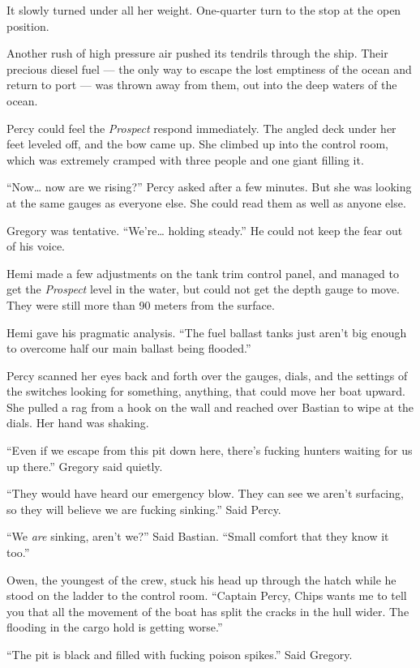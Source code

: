 \documentclass[
]{scrbook}
\begin{document}
It slowly turned under all her weight. One-quarter turn to the stop at
the open position.

Another rush of high pressure air pushed its tendrils through the ship.
Their precious diesel fuel --- the only way to escape the lost emptiness
of the ocean and return to port --- was thrown away from them, out into
the deep waters of the ocean.

Percy could feel the \emph{Prospect} respond immediately. The angled
deck under her feet leveled off, and the bow came up. She climbed up
into the control room, which was extremely cramped with three people and
one giant filling it.

``Now\ldots{} now are we rising?'' Percy asked after a few minutes. But
she was looking at the same gauges as everyone else. She could read them
as well as anyone else.

Gregory was tentative. ``We're\ldots{} holding steady.'' He could not
keep the fear out of his voice.

Hemi made a few adjustments on the tank trim control panel, and managed
to get the \emph{Prospect} level in the water, but could not get the
depth gauge to move. They were still more than 90 meters from the
surface.

Hemi gave his pragmatic analysis. ``The fuel ballast tanks just aren't
big enough to overcome half our main ballast being flooded.''

Percy scanned her eyes back and forth over the gauges, dials, and the
settings of the switches looking for something, anything, that could
move her boat upward. She pulled a rag from a hook on the wall and
reached over Bastian to wipe at the dials. Her hand was shaking.

``Even if we escape from this pit down here, there's fucking hunters
waiting for us up there.'' Gregory said quietly.

``They would have heard our emergency blow. They can see we aren't
surfacing, so they will believe we are fucking sinking.'' Said Percy.

``We \emph{are} sinking, aren't we?'' Said Bastian. ``Small comfort that
they know it too.''

Owen, the youngest of the crew, stuck his head up through the hatch
while he stood on the ladder to the control room. ``Captain Percy, Chips
wants me to tell you that all the movement of the boat has split the
cracks in the hull wider. The flooding in the cargo hold is getting
worse.''

``The pit is black and filled with fucking poison spikes.'' Said
Gregory.
\end{document}
